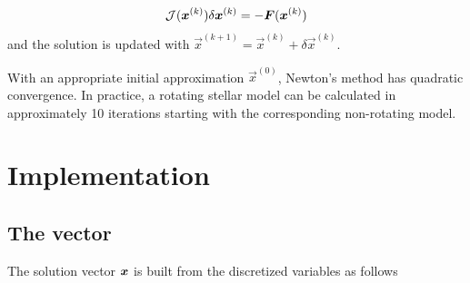 \begin{equation}
\tens J(\vec x^{(k)})\delta \vec x^{(k)}=-\vec F(\vec x^{(k)})
\end{equation}
and the solution is updated with
$\vec x^{(k+1)}=\vec x^{(k)}+\delta \vec x^{(k)}$.

With an appropriate initial approximation $\vec x^{(0)}$, Newton's method
has quadratic convergence. In practice, a rotating stellar model can be
calculated in approximately 10 iterations starting with the corresponding
non-rotating model.

\section{Implementation}

\subsection{The vector}

The solution vector $\vx$ is built from the discretized variables as
follows

